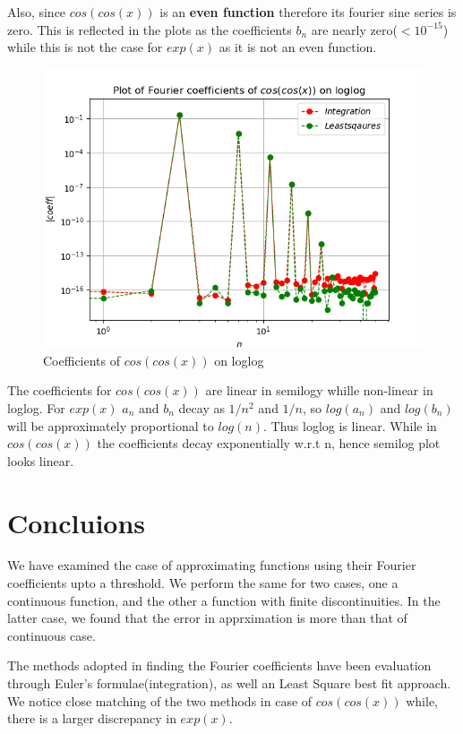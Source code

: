 \documentclass[11pt, a4paper]{article}
\begin{document}
    Also, since $cos(cos(x))$ is an \textbf{even function} therefore its fourier sine series is zero. This is reflected in the plots as the coefficients $b_n$ are nearly zero($<10^{-15}$) while this is not the case for $exp(x)$ as it is not an even function.
    \begin{figure}[!h]
        \centering
        \includegraphics[scale = 0.7]{Figure 6.png}
        \caption{Coefficients of $cos(cos(x))$ on loglog}
        \label{fig:Figure 6}
    \end{figure}
    
    The coefficients for $cos(cos(x))$ are linear in semilogy whille non-linear in loglog. For $exp(x)$ $a_n$ and $b_n$ decay as $1/n^2$ and $1/n$, so $log(a_n)$ and $log(b_n)$ will be approximately proportional to $log(n)$. Thus loglog is linear. While in $cos(cos(x))$ the coefficients decay exponentially w.r.t n, hence semilog plot looks linear. 
\section{Concluions}
We have examined the case of approximating functions using their Fourier coefficients upto a threshold. We perform the same for two cases, one a continuous function, and the other a function with finite discontinuities. In the latter case, we found that the error in apprximation is more than that of continuous case.

The methods adopted in finding the Fourier coefficients have been evaluation through Euler's formulae(integration), as well an Least Square best fit approach. We notice close matching of the two methods in case of $cos(cos(x))$ while, there is a larger discrepancy in $exp(x)$.
\end{document}
